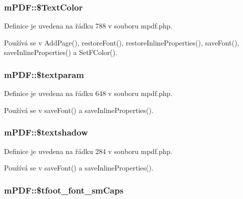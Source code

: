 \hypertarget{classm_p_d_f_afcbd654719f8e5179947d1afd7a3245c}{
\subsubsection[{\$\-Text\-Color}]{\setlength{\rightskip}{0pt plus 5cm}m\-P\-D\-F\-::\$\-Text\-Color}}\label{classm_p_d_f_afcbd654719f8e5179947d1afd7a3245c}


Definice je uvedena na řádku 788 v souboru mpdf.\-php.



Používá se v Add\-Page(), restore\-Font(), restore\-Inline\-Properties(), save\-Font(), save\-Inline\-Properties() a Set\-F\-Color().

\hypertarget{classm_p_d_f_a1b9bfa52366e53122658d5024e3e6698}{
\subsubsection[{\$textparam}]{\setlength{\rightskip}{0pt plus 5cm}m\-P\-D\-F\-::\$textparam}}\label{classm_p_d_f_a1b9bfa52366e53122658d5024e3e6698}


Definice je uvedena na řádku 648 v souboru mpdf.\-php.



Používá se v save\-Font() a save\-Inline\-Properties().

\hypertarget{classm_p_d_f_a977abf882ac3566d4a82bd46ac23b3d1}{
\subsubsection[{\$textshadow}]{\setlength{\rightskip}{0pt plus 5cm}m\-P\-D\-F\-::\$textshadow}}\label{classm_p_d_f_a977abf882ac3566d4a82bd46ac23b3d1}


Definice je uvedena na řádku 284 v souboru mpdf.\-php.



Používá se v save\-Font() a save\-Inline\-Properties().

\hypertarget{classm_p_d_f_a4ab435435993637d08ba8eea25d0346f}{
\subsubsection[{\$tfoot\-\_\-font\-\_\-sm\-Caps}]{\setlength{\rightskip}{0pt plus 5cm}m\-P\-D\-F\-::\$tfoot\-\_\-font\-\_\-sm\-Caps}}\label{classm_p_d_f_a4ab435435993637d08ba8eea25d0346f}


